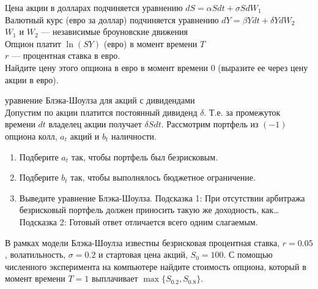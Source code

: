 \begin{problem}
Цена акции в долларах подчиняется уравнению $dS=\alpha Sdt+\sigma SdW_{1}$ \\
Валютный курс (евро за доллар) подчиняется уравнению $dY=\beta Ydt+\delta YdW_{2}$ \\
$W_{1}$ и $W_{2}$ — независимые броуновские движения \\
Опцион платит $\ln(SY)$ (евро) в момент времени $T$ \\
$r$ — процентная ставка в евро. \\
Найдите цену этого опциона в евро в момент времени $0$ (выразите ее через цену акции в евро).

\begin{sol}

\end{sol}
\end{problem}

\begin{problem}
 уравнение Блэка-Шоулза для акций с дивидендами \\
Допустим по акции платится постоянный дивиденд $\delta$. Т.е. за промежуток времени $dt$ владелец акции получает $\delta Sdt$. Рассмотрим портфель из $(-1)$ опциона колл, $a_{t}$ акций и $b_{t}$ наличности.
\begin{enumerate}
\item Подберите $a_{t}$ так, чтобы портфель был безрисковым.
\item Подберите $b_{t}$ так, чтобы выполнялось бюджетное ограничение.
\item Выведите уравнение Блэка-Шоулза.
Подсказка 1: При отсутствии арбитража безрисковый портфель должен приносить такую же доходность, как\ldots \\
Подсказка 2: Готовый ответ отличается всего одним слагаемым.
\end{enumerate}

\begin{sol}

\end{sol}
\end{problem}

\begin{problem}
В рамках модели Блэка-Шоулза известны безрисковая процентная ставка, $r=0.05$, волатильность, $\sigma=0.2$ и стартовая цена акций, $S_0=100$. С помощью численного эксперимента на компьютере найдите стоимость опциона, который в момент времени $T=1$ выплачивает $\max\{ S_{0.2},S_{0.8}\}$.

\begin{sol}
\end{sol}
\end{problem}


